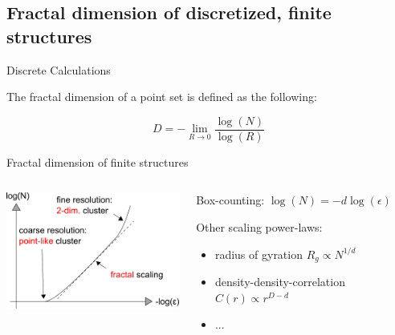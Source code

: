 \documentclass[smaller]{beamer}
\begin{document}
        \subsection{Fractal dimension of discretized, finite structures}
                \begin{frame}{Discrete Calculations}
                  \begin{definition}
                    The fractal dimension of a point set is defined as the following:
        
                    $$D=-\lim_{R\rightarrow 0}\frac{\log(N)}{\log(R)}$$

                  \end{definition} \pause

                  \begin{center}
                \end{center}
                \end{frame}

            \begin{frame}{Fractal dimension of finite structures}
                \begin{columns}
                    \begin{column}{6cm}
                        \includegraphics[width=6cm]{img/frac_01.png}
                    \end{column}
                    \begin{column}{5cm}
                        Box-counting:
                        $\log(N)=-d \log(\epsilon)$

                        \vspace{1cm}
                        Other scaling power-laws:
                        \begin{itemize}
                            \item radius of gyration $R_g\propto N^{1/d}$
                            \item density-density-correlation $C(r)\propto r^{D-d}$
                            \item ...
                        \end{itemize}
                    \end{column}
                \end{columns}
            \end{frame}
\end{document}
